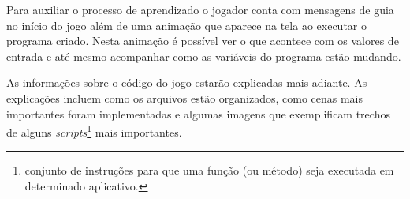 Para auxiliar o processo de aprendizado o jogador conta com mensagens de guia no 
início do jogo além de uma animação que aparece na tela ao executar o programa 
criado. Nesta animação é possível ver o que acontece com os valores de entrada 
e até mesmo acompanhar como as variáveis do programa estão mudando.

As informações sobre o código do jogo estarão explicadas mais adiante. As 
explicações incluem como os arquivos estão organizados, como cenas mais 
importantes foram implementadas e algumas imagens que exemplificam trechos de 
alguns \textit{scripts}\footnote{conjunto de instruções para que uma função 
(ou método) seja executada em determinado aplicativo.} mais importantes.
